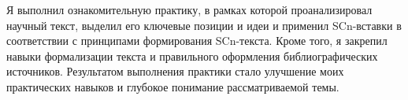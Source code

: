 
Я выполнил ознакомительную практику, в рамках которой проанализировал научный текст, выделил его ключевые позиции и идеи и применил SCn-вставки в соответствии с принципами формирования SCn-текста. Кроме того, я закрепил навыки формализации текста и правильного оформления библиографических источников. Результатом выполнения практики стало улучшение моих практических навыков и глубокое понимание рассматриваемой темы.